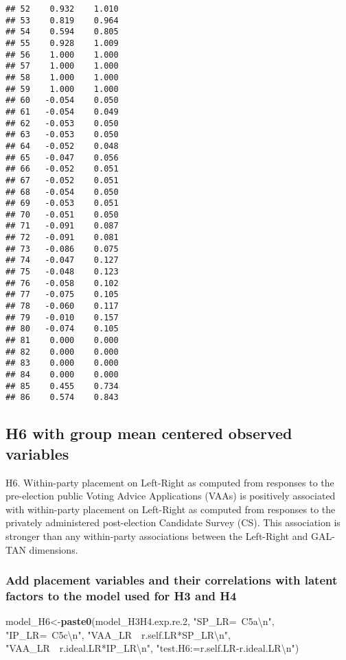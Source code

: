 \documentclass[
]{article}
\newenvironment{Shaded}{\begin{snugshade}}{\end{snugshade}}
\newcommand{\CharTok}[1]{\textcolor[rgb]{0.31,0.60,0.02}{#1}}
\newcommand{\FloatTok}[1]{\textcolor[rgb]{0.00,0.00,0.81}{#1}}
\newcommand{\KeywordTok}[1]{\textcolor[rgb]{0.13,0.29,0.53}{\textbf{#1}}}
\newcommand{\NormalTok}[1]{#1}
\newcommand{\StringTok}[1]{\textcolor[rgb]{0.31,0.60,0.02}{#1}}
\begin{document}
\begin{verbatim}
## 52    0.932    1.010
## 53    0.819    0.964
## 54    0.594    0.805
## 55    0.928    1.009
## 56    1.000    1.000
## 57    1.000    1.000
## 58    1.000    1.000
## 59    1.000    1.000
## 60   -0.054    0.050
## 61   -0.054    0.049
## 62   -0.053    0.050
## 63   -0.053    0.050
## 64   -0.052    0.048
## 65   -0.047    0.056
## 66   -0.052    0.051
## 67   -0.052    0.051
## 68   -0.054    0.050
## 69   -0.053    0.051
## 70   -0.051    0.050
## 71   -0.091    0.087
## 72   -0.091    0.081
## 73   -0.086    0.075
## 74   -0.047    0.127
## 75   -0.048    0.123
## 76   -0.058    0.102
## 77   -0.075    0.105
## 78   -0.060    0.117
## 79   -0.010    0.157
## 80   -0.074    0.105
## 81    0.000    0.000
## 82    0.000    0.000
## 83    0.000    0.000
## 84    0.000    0.000
## 85    0.455    0.734
## 86    0.574    0.843
\end{verbatim}

\newpage

\hypertarget{h6-with-group-mean-centered-observed-variables}{%
\subsection{H6 with group mean centered observed
variables}\label{h6-with-group-mean-centered-observed-variables}}

H6. Within-party placement on Left-Right as computed from responses to
the pre-election public Voting Advice Applications (VAAs) is positively
associated with within-party placement on Left-Right as computed from
responses to the privately administered post-election Candidate Survey
(CS). This association is stronger than any within-party associations
between the Left-Right and GAL-TAN dimensions.

\hypertarget{add-placement-variables-and-their-correlations-with-latent-factors-to-the-model-used-for-h3-and-h4}{%
\subsubsection{Add placement variables and their correlations with
latent factors to the model used for H3 and
H4}\label{add-placement-variables-and-their-correlations-with-latent-factors-to-the-model-used-for-h3-and-h4}}

\begin{Shaded}
\begin{Highlighting}[]
\NormalTok{model_H6<-}\KeywordTok{paste0}\NormalTok{(model_H3H4.exp.re}\FloatTok{.2}\NormalTok{,}
                 \StringTok{"SP_LR=~C5a}\CharTok{\textbackslash{}n}\StringTok{"}\NormalTok{,}
                 \StringTok{"IP_LR=~C5c}\CharTok{\textbackslash{}n}\StringTok{"}\NormalTok{,}
                 \StringTok{"VAA_LR~~r.self.LR*SP_LR}\CharTok{\textbackslash{}n}\StringTok{"}\NormalTok{,}
                 \StringTok{"VAA_LR~~r.ideal.LR*IP_LR}\CharTok{\textbackslash{}n}\StringTok{"}\NormalTok{,}
                 \StringTok{"test.H6:=r.self.LR-r.ideal.LR}\CharTok{\textbackslash{}n}\StringTok{"}\NormalTok{)}
\end{Highlighting}
\end{Shaded}
\end{document}
